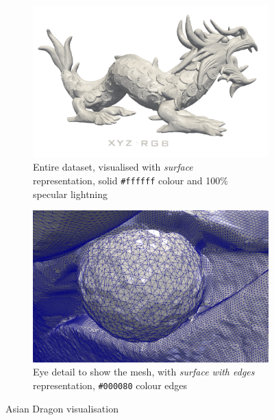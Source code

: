 \documentclass[openany]{article}
\begin{document}
\begin{figure}[h]
\centering
\begin{subfigure}{.5\textwidth}
  \centering
  \includegraphics[width=\linewidth]{Asian_Dragon/asian_dragon}
  \caption{Entire dataset, visualised with \textit{surface}  \\
  representation, solid \texttt{\#ffffff} colour and 100\% \\ specular lightning}
\end{subfigure}%
\begin{subfigure}{.5\textwidth}
  \centering
  \includegraphics[width=\linewidth]{Asian_Dragon/eye_detail_edges}
  \caption{Eye detail to show the mesh, with \textit{surface with edges} representation, \texttt{\#000080} colour edges}
\end{subfigure}
\caption{Asian Dragon visualisation}
\end{figure}
\end{document}
